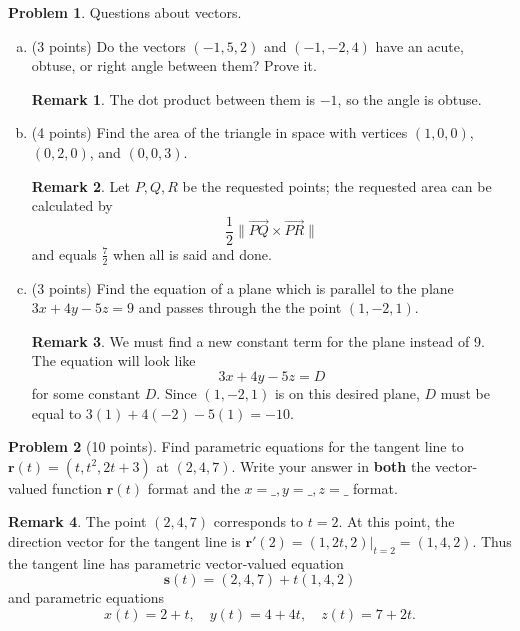 \documentclass[11pt,oneside]{amsart}
\theoremstyle{definition}
\newtheorem{problem}{Problem}
\newtheorem*{remark}{Remark}
\theoremstyle{plain}
\newcommand{\br}{{\mathbf{r}}}
\newcommand{\bs}{{\mathbf{s}}}
\begin{document}
\newpage

\begin{problem}
  Questions about vectors.
  \begin{enumerate}[(a)]
    \item (3 points) Do the vectors $(-1,5,2)$ and $(-1,-2,4)$ have an acute, obtuse, or right angle between them? Prove it.
    \begin{remark}\color{blue}
      The dot product between them is $-1$, so the angle is obtuse.
    \end{remark}
    \vfill
    \item (4 points) Find the area of the triangle in space with vertices $(1,0,0)$, $(0,2,0)$, and $(0,0,3)$.
    \begin{remark}\color{blue}
      Let $P,Q,R$ be the requested points; the requested area can be calculated by
      \[\frac12\|\overrightarrow{PQ}\times\overrightarrow{PR}\|\]
      and equals $\frac72$ when all is said and done.
    \end{remark}
    \vfill
    \item (3 points) Find the equation of a plane which is parallel to the plane $3x+4y-5z=9$ and passes through the the point $(1,-2,1)$.
    \begin{remark}\color{blue}
      We must find a new constant term for the plane instead of 9. The equation will look like
      \[3x+4y-5z=D\]
      for some constant $D$. Since $(1,-2,1)$ is on this desired plane, $D$ must be equal to $3(1)+4(-2)-5(1)=-10$.
    \end{remark}
    \vfill
  \end{enumerate}
\end{problem}

\newpage

\begin{problem}[10 points]
  Find parametric equations for the tangent line to $\br(t)=(t,t^2,2t+3)$ at $(2,4,7)$. Write your answer in \textbf{both} the vector-valued function $\br(t)$ format and the $x=\_,y=\_,z=\_$ format.
\end{problem}
\begin{remark}\color{blue}
  The point $(2,4,7)$ corresponds to $t=2$. At this point, the direction vector for the tangent line is $\br'(2)=(1,2t,2)\Big|_{t=2}=(1,4,2)$. Thus the tangent line has parametric vector-valued equation
  \[\bs(t)=(2,4,7)+t(1,4,2)\]
  and parametric equations
  \[x(t)=2+t,\quad y(t)=4+4t,\quad z(t)=7+2t.\]
\end{remark}
\end{document}

